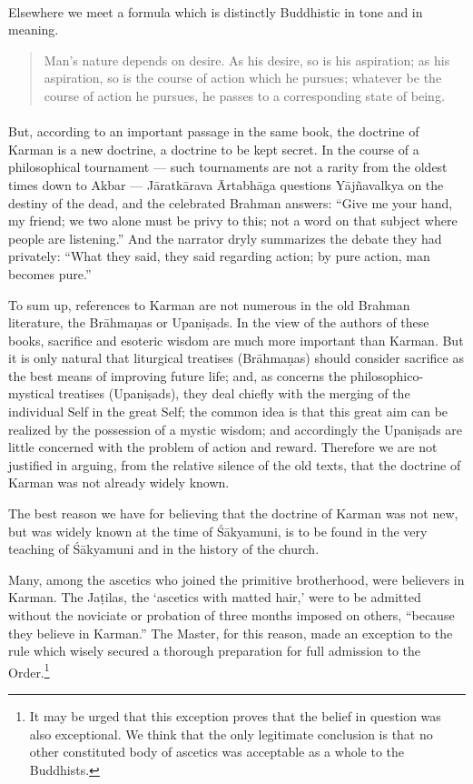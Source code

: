 \documentclass[a4paper, 11pt, oneside, english, landscape]{article}
\begin{document}
\paragraph{}
Elsewhere we meet a formula which is distinctly Buddhistic in tone and in meaning.
\begin{quotation}
\small
Man's nature depends on desire. As his desire, so is his aspiration; as his aspiration, so is the course of action which he pursues; whatever be the course of action he pursues, he passes to a corresponding state of being.
\end{quotation}
\paragraph{}
But, according to an important passage in the same book, the doctrine of Karman is a new doctrine, a doctrine to be kept secret. In the course of a philosophical tournament --- such tournaments are not a rarity from the oldest times down to Akbar --- Jāratkārava Ārtabhāga questions Yājñavalkya on the destiny of the dead, and the celebrated Brahman answers: ``Give me your hand, my friend; we two alone must be privy to this; not a word on that subject where people are listening.'' And the narrator dryly summarizes the debate they had privately: ``What they said, they said regarding action; by pure action, man becomes pure.''

To sum up, references to Karman are not numerous in the old Brahman literature, the Brāhmaṇas or Upaniṣads. In the view of the authors of these books, sacrifice and esoteric wisdom are much more important than Karman. But it is only natural that liturgical treatises (Brāhmaṇas) should consider sacrifice as the best means of improving future life; and, as concerns the philosophico-mystical treatises (Upaniṣads), they deal chiefly with the merging of the individual Self in the great Self; the common idea is that this great aim can be realized by the possession of a mystic wisdom; and accordingly the Upaniṣads are little concerned with the problem of action and reward. Therefore we are not justified in arguing, from the relative silence of the old texts, that the doctrine of Karman was not already widely known.

The best reason we have for believing that the doctrine of Karman was not new, but was widely known at the time of Śākyamuni, is to be found in the very teaching of Śākyamuni and in the history of the church.

Many, among the ascetics who joined the primitive brotherhood, were believers in Karman. The Jaṭilas, the `ascetics with matted hair,' were to be admitted without the noviciate or probation of three months imposed on others, ``because they believe in Karman.'' The Master, for this reason, made an exception to the rule which wisely secured a thorough preparation for full admission to the Order.\footnote{It may be urged that this exception proves that the belief in question was also exceptional. We think that the only legitimate conclusion is that no other constituted body of ascetics was acceptable as a whole to the Buddhists.}
\end{document}
